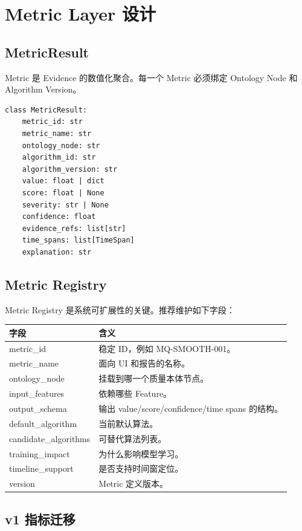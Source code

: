 \documentclass[UTF8,zihao=-4,oneside,openany]{ctexrep}
\begin{document}
\section{Metric Layer 设计}

\subsection{MetricResult}

Metric 是 Evidence 的数值化聚合。每一个 Metric 必须绑定 Ontology Node 和 Algorithm Version。

\begin{verbatim}
class MetricResult:
    metric_id: str
    metric_name: str
    ontology_node: str
    algorithm_id: str
    algorithm_version: str
    value: float | dict
    score: float | None
    severity: str | None
    confidence: float
    evidence_refs: list[str]
    time_spans: list[TimeSpan]
    explanation: str
\end{verbatim}

\subsection{Metric Registry}

Metric Registry 是系统可扩展性的关键。推荐维护如下字段：

\begin{longtable}{L{4cm} L{9.5cm}}
\toprule
字段 & 含义 \\
\midrule
metric\_id & 稳定 ID，例如 MQ-SMOOTH-001。 \\
metric\_name & 面向 UI 和报告的名称。 \\
ontology\_node & 挂载到哪一个质量本体节点。 \\
input\_features & 依赖哪些 Feature。 \\
output\_schema & 输出 value/score/confidence/time spans 的结构。 \\
default\_algorithm & 当前默认算法。 \\
candidate\_algorithms & 可替代算法列表。 \\
training\_impact & 为什么影响模型学习。 \\
timeline\_support & 是否支持时间窗定位。 \\
version & Metric 定义版本。 \\
\bottomrule
\end{longtable}

\subsection{v1 指标迁移}
\end{document}
